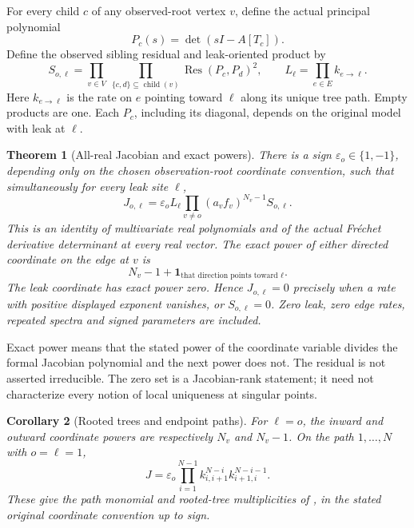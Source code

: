 \documentclass[11pt]{article}
\newtheorem{theorem}{Theorem}
\newtheorem{corollary}[theorem]{Corollary}
\theoremstyle{remark}
\newcommand{\Res}{\operatorname{Res}}
\newcommand{\1}{\mathbf 1}
\begin{document}
For every child $c$ of any observed-root vertex $v$, define the actual
principal polynomial
\[
 P_c(s)=\det(sI-A[T_c]).
\]
Define the observed sibling residual and leak-oriented product by
\begin{equation}\label{eq:residual}
 S_{o,\ell}=\prod_{v\in V}\ \prod_{\{c,d\}\subseteq\operatorname{child}(v)}
       \Res(P_c,P_d)^2,\qquad
 L_\ell=\prod_{e\in E} k_{e\to\ell}.
\end{equation}
Here $k_{e\to\ell}$ is the rate on $e$ pointing toward $\ell$ along its
unique tree path. Empty products are one. Each $P_c$, including its diagonal,
depends on the original model with leak at $\ell$.

\begin{theorem}[All-real Jacobian and exact powers]\label{thm:jac}
There is a sign $\varepsilon_o\in\{1,-1\}$, depending only on the chosen
observation-root coordinate convention, such that simultaneously for every
leak site $\ell$,
\begin{equation}\label{eq:main}
 J_{o,\ell}=\varepsilon_o L_\ell
       \prod_{v\ne o}(a_vf_v)^{N_v-1}S_{o,\ell}.
\end{equation}
This is an identity of multivariate real polynomials and of the actual
Fr\'{e}chet derivative determinant at every real vector. The exact power of
either directed coordinate on the edge at $v$ is
\begin{equation}\label{eq:exponent}
 N_v-1+\1_{\text{that direction points toward }\ell}.
\end{equation}
The leak coordinate has exact power zero. Hence $J_{o,\ell}=0$ precisely
when a rate with positive displayed exponent vanishes, or $S_{o,\ell}=0$.
Zero leak, zero edge rates, repeated spectra and signed parameters are included.
\end{theorem}

Exact power means that the stated power of the coordinate variable divides
the formal Jacobian polynomial and the next power does not. The residual
is not asserted irreducible. The zero set is a Jacobian-rank statement;
it need not characterize every notion of local uniqueness at singular points.

\begin{corollary}[Rooted trees and endpoint paths]\label{cor:path}
For $\ell=o$, the inward and outward coordinate powers are respectively
$N_v$ and $N_v-1$. On the path $1,\ldots,N$ with $o=\ell=1$,
\[
 J=\varepsilon_o\prod_{i=1}^{N-1}
       k_{i,i+1}^{N-i}k_{i+1,i}^{N-i-1}.
\]
These give the path monomial and rooted-tree multiplicities of
\cite[Conjectures 5.5 and 5.9]{GMS}, in the stated original coordinate
convention up to sign.
\end{corollary}
\end{document}
